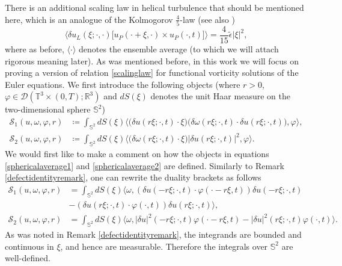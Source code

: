 \documentclass[12pt,a4paper]{article}
\theoremstyle{definition}
\theoremstyle{remark}
\numberwithin{equation}{section}
\begin{document}
There is an additional scaling law in helical turbulence that should be mentioned here, which is an analogue of the Kolmogorov $\frac{4}{5}$-law \cite{lvov,kurien,kurienreflection,chkhetiani} (see also \cite{ye})
\begin{equation}
\big\langle \delta u_L (\xi;\cdot,\cdot) \big[ u_P (\cdot+\xi,\cdot) \times u_P (\cdot,t) \big] \big\rangle = \frac{4}{15} \tilde{\epsilon} \lvert \xi \rvert^2,
\end{equation}
where as before, $\langle \cdot \rangle$ denotes the ensemble average (to which we will attach rigorous meaning later).
As was mentioned before, in this work we will focus on proving a version of relation \eqref{scalinglaw} for functional vorticity solutions of the Euler equations. We first introduce the following objects (where $r > 0$, $\varphi  \in \mathcal{D} (\mathbb{T}^3 \times (0,T); \mathbb{R}^3)$ and $d S (\xi)$ denotes the unit Haar measure on the two-dimensional sphere $\mathbb{S}^2$)
\begin{align}
\mathcal{S}_1 (u, \omega, \varphi, r) &\coloneqq \int_{\mathbb{S}^2} d S (\xi) \big\langle \big( \delta u (r \xi;\cdot,t) \cdot \xi \big) \big( \delta \omega (r \xi;\cdot,t) \cdot \delta u (r \xi;\cdot,t) \big), \varphi \big\rangle, \label{sphericalaverage1} \\
\mathcal{S}_2 (u, \omega, \varphi, r) &\coloneqq \int_{\mathbb{S}^2} d S (\xi) \big\langle \big( \delta \omega (r \xi;\cdot,t) \cdot \xi \big) \lvert \delta u (r \xi;\cdot,t) \rvert^2, \varphi \big\rangle. \label{sphericalaverage2}
\end{align} 
We would first like to make a comment on how the objects in equations \eqref{sphericalaverage1} and \eqref{sphericalaverage2} are defined. Similarly to Remark \ref{defectidentityremark}, one can rewrite the duality brackets as follows
\begin{align}
\mathcal{S}_1 (u, \omega, \varphi, r) &= \int_{\mathbb{S}^2} d S (\xi) \bigg\langle \omega, (\delta u (-r \xi ; \cdot , t) \cdot \varphi (\cdot - r \xi, t)) \delta u (- r \xi ; \cdot , t) \nonumber \\
&- (\delta u (r \xi ; \cdot, t) \cdot \varphi (\cdot, t)) \delta u (r \xi ; \cdot, t) \bigg\rangle, \label{dualsphericalaverage1} \\
\mathcal{S}_2 (u, \omega, \varphi, r) &= \int_{\mathbb{S}^2} d S (\xi) \bigg\langle \omega, \lvert \delta u \rvert^2 (-r \xi ; \cdot, t) \varphi (\cdot - r \xi , t) - \lvert \delta u \rvert^2 (r \xi ; \cdot, t) \varphi (\cdot, t) \bigg\rangle. \label{dualsphericalaverage2}
\end{align} 
As was noted in Remark \ref{defectidentityremark}, the integrands are bounded and continuous in $\xi$, and hence are measurable. Therefore the integrals over $\mathbb{S}^2$ are well-defined. 
\end{document}
